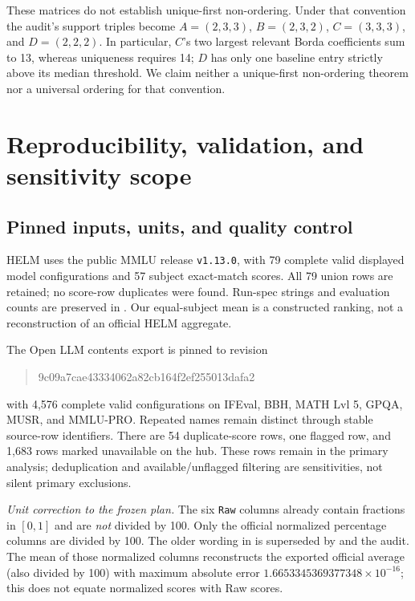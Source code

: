 These matrices do not establish unique-first non-ordering. Under that convention the audit's support triples become $A=(2,3,3)$, $B=(2,3,2)$, $C=(3,3,3)$, and $D=(2,2,2)$. In particular, $C$'s two largest relevant Borda coefficients sum to 13, whereas uniqueness requires 14; $D$ has only one baseline entry strictly above its median threshold. We claim neither a unique-first non-ordering theorem nor a universal ordering for that convention.

\section{Reproducibility, validation, and sensitivity scope}
\label{app:repro}

\subsection{Pinned inputs, units, and quality control}
\label{app:data}
HELM uses the public MMLU release \texttt{v1.13.0}, with 79 complete valid displayed model configurations and 57 subject exact-match scores. All 79 union rows are retained; no score-row duplicates were found. Run-spec strings and evaluation counts are preserved in . Our equal-subject mean is a constructed ranking, not a reconstruction of an official HELM aggregate.

The Open LLM contents export is pinned to revision
\begin{quote}\small\ttfamily
9c09a7cae43334062a82c\allowbreak{}b164f2ef255013dafa2
\end{quote}
with 4,576 complete valid configurations on IFEval, BBH, MATH Lvl 5, GPQA, MUSR, and MMLU-PRO. Repeated names remain distinct through stable source-row identifiers. There are 54 duplicate-score rows, one flagged row, and 1,683 rows marked unavailable on the hub. These rows remain in the primary analysis; deduplication and available/unflagged filtering are sensitivities, not silent primary exclusions.

\emph{Unit correction to the frozen plan.} The six \texttt{Raw} columns already contain fractions in $[0,1]$ and are \emph{not} divided by 100. Only the official normalized percentage columns are divided by 100. The older wording in  is superseded by  and the audit. The mean of those normalized columns reconstructs the exported official average (also divided by 100) with maximum absolute error $1.6653345369377348\times10^{-16}$; this does not equate normalized scores with Raw scores.

